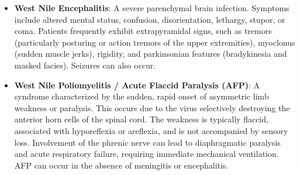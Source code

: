 \begin{itemize}
\begin{itemize}
        \item \textbf{West Nile Encephalitis}: A severe parenchymal brain infection. Symptoms include altered mental status, confusion, disorientation, lethargy, stupor, or coma. Patients frequently exhibit extrapyramidal signs, such as tremors (particularly posturing or action tremors of the upper extremities), myoclonus (sudden muscle jerks), rigidity, and parkinsonian features (bradykinesia and masked facies). Seizures can also occur.
        \item \textbf{West Nile Poliomyelitis / Acute Flaccid Paralysis (AFP)}: A syndrome characterized by the sudden, rapid onset of asymmetric limb weakness or paralysis. This occurs due to the virus selectively destroying the anterior horn cells of the spinal cord. The weakness is typically flaccid, associated with hyporeflexia or areflexia, and is not accompanied by sensory loss. Involvement of the phrenic nerve can lead to diaphragmatic paralysis and acute respiratory failure, requiring immediate mechanical ventilation. AFP can occur in the absence of meningitis or encephalitis.
    \end{itemize}
\end{itemize}

